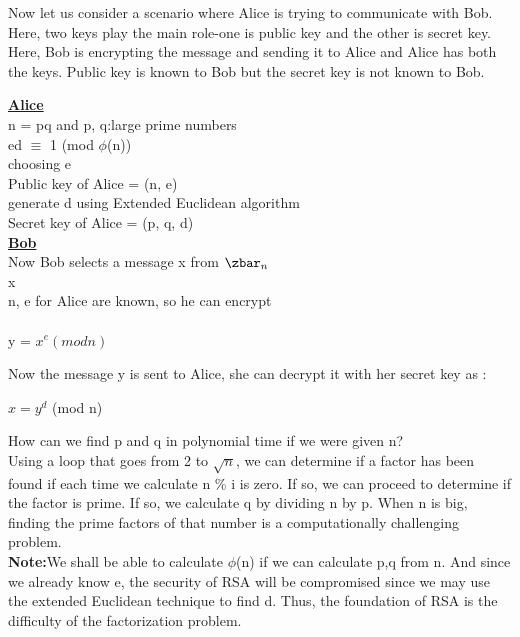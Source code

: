 \documentclass[11pt]{article}
\begin{document}
Now let us consider a scenario where Alice is trying to communicate with Bob. Here, two keys play the main role-one is public key and the other is secret key. Here, Bob is encrypting the message and sending it to Alice and Alice has both the keys. Public key is known to Bob but the secret key is not known to Bob.\\
\begin{center}
    \textbf{\underline{Alice}}\\
n = pq and p, q:large prime numbers\\
ed $\equiv$ 1 (mod $\phi$(n))\\
choosing e\\
Public key of Alice = (n, e)\\
generate d using Extended Euclidean algorithm\\
Secret key of Alice = (p, q, d)\\
\textbf{\underline{Bob}}\\
Now Bob selects a message x from ${\zbar}_n$\\
x\\
n, e for Alice are known, so he can encrypt\\\\
y = $x^e (mod n)$\\
\end{center}

\vspace{3mm}
Now the message y is sent to Alice, she can decrypt it with her secret key as :
\begin{center}
    $x = y^d$ (mod n)
\end{center}
How can we find p and q in polynomial time if we were given n?\\
Using a loop that goes from 2 to $\sqrt{n}$, we can determine if a factor has been found if each time we calculate n \% i is zero. If so, we can proceed to determine if the factor is prime. If so, we calculate q by dividing n by p. When n is big, finding the prime factors of that number is a computationally challenging problem.\\
\textbf{Note:}We shall be able to calculate $\phi$(n) if we can calculate p,q from n. And since we already know e, the security of RSA will be compromised since we may use the extended Euclidean technique to find d. Thus, the foundation of RSA is the difficulty of the factorization problem.\\
\end{document}

